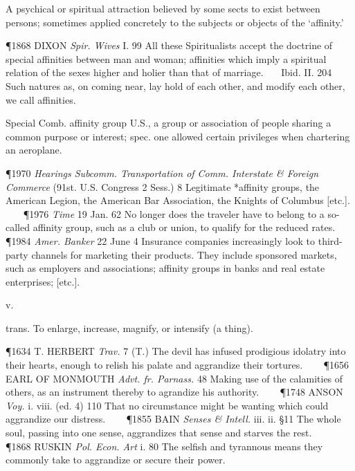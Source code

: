 \begin{description}[wide, labelwidth=!, labelindent=0pt]
\begin{myenumerate}
 A psychical or spiritual attraction believed by some sects to exist between persons; sometimes applied concretely to the subjects or objects of the ‘affinity.’ 

\P 1868 DIXON \textit{Spir. Wives} I. 99 All these Spiritualists accept the doctrine of special affinities between man and woman; affinities which imply a spiritual relation of the sexes higher and holier than that of marriage.    Ibid. II. 204 Such natures as, on coming near, lay hold of each other, and modify each other, we call affinities.

 Special Comb. affinity group U.S., a group or association of people sharing a common purpose or interest; spec. one allowed certain privileges when chartering an aeroplane. 

\P 1970 \textit{Hearings Subcomm. Transportation of Comm. Interstate \& Foreign Commerce} (91st. U.S. Congress 2 Sess.) 8 Legitimate *affinity groups, the American Legion, the American Bar Association, the Knights of Columbus [etc.].    
\P 1976 \textit{Time} 19 Jan. 62 No longer does the traveler have to belong to a so-called affinity group, such as a club or union, to qualify for the reduced rates.    
\P 1984 \textit{Amer. Banker} 22 June 4 Insurance companies increasingly look to third-party channels for marketing their products. They include sponsored markets, such as employers and associations; affinity groups in banks and real estate enterprises; [etc.].
\end{myenumerate}

  v.

\noindent  {}

\noindent  
[f. Fr. agrandiss- extended stem of agrand-ir (16th c. aggr-), prob. ad. It. aggrandire; f. ag- = ad- to + grandire, L. grandīre to make great; f. grandis large. The ending is assimilated to words of Gr. origin with -ize.] 
\vspace{-0.3cm}

\begin{myenumerate}
 trans. To enlarge, increase, magnify, or intensify (a thing). 

\P 1634 T. HERBERT \textit{Trav.} 7 (T.) The devil has infused prodigious idolatry into their hearts, enough to relish his palate and aggrandize their tortures.    
\P 1656 EARL OF MONMOUTH  \textit{Advt. fr. Parnass.} 48 Making use of the calamities of others, as an instrument thereby to agrandize his authority.    
\P 1748 ANSON \textit{Voy.} i. viii. (ed. 4) 110 That no circumstance might be wanting which could aggrandize our distress.    
\P 1855 BAIN \textit{Senses \& Intell.} iii. ii. §11 The whole soul, passing into one sense, aggrandizes that sense and starves the rest.    
\P 1868 RUSKIN \textit{Pol. Econ. Art} i. 80 The selfish and tyrannous means they commonly take to aggrandize or secure their power.


\end{myenumerate}
\end{description}
